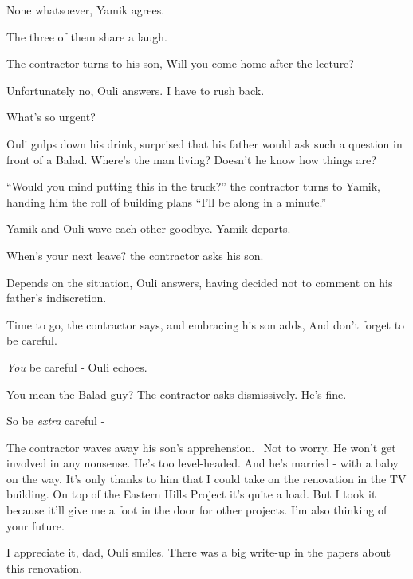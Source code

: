 \documentclass[letterpaper]{article}
\begin{document}
{\textquotedbl}None whatsoever,{\textquotedbl} Yamik agrees. 

The three of them share a laugh. 

The contractor turns to his son, {\textquotedbl}Will you come home after the lecture?{\textquotedbl} 

{\textquotedbl}Unfortunately no,{\textquotedbl} Ouli answers. {\textquotedbl}I have to rush back.{\textquotedbl} 

{\textquotedbl}What's so urgent?{\textquotedbl} 

Ouli gulps down his drink, surprised that his father would ask such a question in front of a Balad. Where's the man
living? Doesn't he know how things are? \ 

{}``Would you mind putting this in the truck?'' the contractor turns to Yamik, handing him the roll of building plans
``I'll be along in a minute.''

Yamik and Ouli wave each other goodbye. Yamik departs.

{\textquotedbl}When's your next leave?{\textquotedbl} the contractor asks his son. 

{\textquotedbl}Depends on the situation,{\textquotedbl} Ouli answers, having decided not to comment on his father's
indiscretion.

{\textquotedbl}Time to go,{\textquotedbl} the contractor says, and embracing his son adds, {\textquotedbl}And don't
forget to be careful.{\textquotedbl} 

{\textquotedbl}\textit{You} be careful -{\textquotedbl} Ouli echoes. 

{\textquotedbl}You mean the Balad guy?{\textquotedbl} The contractor asks dismissively. {\textquotedbl}He's
fine.{\textquotedbl} 

{\textquotedbl}So be \textit{extra} careful -{\textquotedbl} 

The contractor waves away his son's apprehension.~ {\textquotedbl}Not to worry. He won't get involved in any nonsense.
He's too level-headed. And he's married - with a baby on the way. It's only thanks to him that I could take on the
renovation in the TV building. On top of the Eastern Hills Project it's quite a load. But I took it because it'll give
me a foot in the door for other projects. I'm also thinking of your future.{\textquotedbl} 

{\textquotedbl}I appreciate it, dad,{\textquotedbl} Ouli smiles. {\textquotedbl}There was a big write-up in the papers
about this renovation.{\textquotedbl} 
\end{document}
